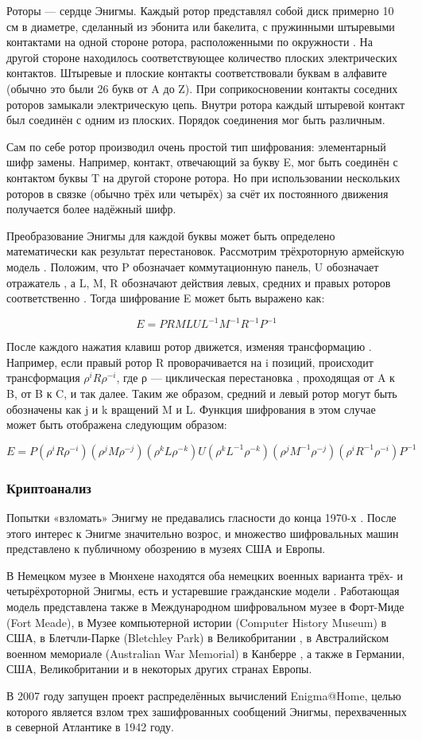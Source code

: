 Роторы — сердце Энигмы. Каждый ротор представлял собой диск примерно 
10 см в диаметре, сделанный из эбонита или бакелита, с пружинными 
штыревыми контактами на одной стороне ротора, расположенными по окружности
. На другой стороне находилось соответствующее количество плоских 
электрических контактов. Штыревые и плоские контакты соответствовали 
буквам в алфавите (обычно это были 26 букв от A до Z). При соприкосновении 
контакты соседних роторов замыкали электрическую цепь. Внутри ротора 
каждый штыревой контакт был соединён с одним из плоских. Порядок соединения 
мог быть различным.

Сам по себе ротор производил очень простой тип шифрования: элементарный 
шифр замены. Например, контакт, отвечающий за букву E, мог быть соединён 
с контактом буквы T на другой стороне ротора. Но при использовании 
нескольких роторов в связке (обычно трёх или четырёх) за счёт их постоянного 
движения получается более надёжный шифр.

Преобразование Энигмы для каждой буквы может быть определено математически 
как результат перестановок. Рассмотрим трёхроторную армейскую модель
. Положим, что P обозначает коммутационную панель, U обозначает отражатель
, а L, M, R обозначают действия левых, средних и правых роторов соответственно
. Тогда шифрование E может быть выражено как:

    $$E = PRMLUL^{-1}M^{-1}R^{-1}P^{-1}$$

После каждого нажатия клавиш ротор движется, изменяя трансформацию
. Например, если правый ротор R проворачивается на i позиций, происходит 
трансформация $\rho^iR\rho^{-i}$, где ρ — циклическая перестановка
, проходящая от A к B, от B к C, и так далее. Таким же образом, средний 
и левый ротор могут быть обозначены как j и k вращений M и L. Функция 
шифрования в этом случае может быть отображена следующим образом:

    $$E = P(\rho^iR\rho^{-i})(\rho^{j}M\rho^{-j})(\rho^{k}L\rho^{-k})U(\rho^kL^{-1}\rho^{-k})(\rho^{j}M^{-1}\rho^{-j})(\rho^{i}R^{-1}\rho^{-i})P^{-1}$$

\subsubsection{Криптоанализ}
Попытки «взломать» Энигму не предавались гласности до конца 1970-х
. После этого интерес к Энигме значительно возрос, и множество шифровальных 
машин представлено к публичному обозрению в музеях США и Европы.

В Немецком музее в Мюнхене находятся оба немецких военных варианта 
трёх- и четырёхроторной Энигмы, есть и устаревшие гражданские модели
. Работающая модель представлена также в Международном шифровальном 
музее в Форт-Миде (Fort Meade), в Музее компьютерной истории (Computer 
History Museum) в США, в Блетчли-Парке (Bletchley Park) в Великобритании
, в Австралийском военном мемориале (Australian War Memorial) в Канберре
, а также в Германии, США, Великобритании и в некоторых других странах 
Европы.

В 2007 году запущен проект распределённых вычислений Enigma@Home, 
целью которого является взлом трех зашифрованных сообщений Энигмы, 
перехваченных в северной Атлантике в 1942 году.
